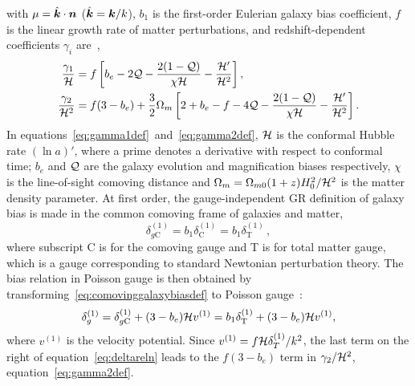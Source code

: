 with \(\mu = \hat{\bm {k}} \cdot \bm {n} \) (\(\hat{\bm {k}} = \bm {k}/k\)), \(b_1\) is the first-order Eulerian galaxy bias coefficient, \(f\) is the linear growth rate of matter perturbations, and redshift-dependent coefficients \(\gamma_i\) are~\cite{Jeong:2011as},
\begin{align}\label{eq:gamma1def}
\frac{\gamma_1}{\mathcal{H}} &= f \left[ b_e - 2 \mathcal{Q} - \frac{2(1-\mathcal{Q})}{\chi \mathcal{H}} - \frac{\mathcal{H}'}{\mathcal{H}^2}\right], \\
\frac{\gamma_2}{\mathcal{H}^2} &= f(3-b_e) + \frac{3}{2} \Omega_m \left[ 2+ b_e - f - 4\mathcal{Q} - \frac{2(1-\mathcal{Q})}{\chi\mathcal{H}} - \frac{\mathcal{H}'}{\mathcal{H}^2} \right].\label{eq:gamma2def}
\end{align}
In equations~\eqref{eq:gamma1def}~and~\eqref{eq:gamma2def}, \(\mathcal{H}\) is the conformal Hubble rate \((\ln a)'\), where a prime denotes a derivative with respect to conformal time; \(b_e\) and \(\mathcal{Q}\) are the galaxy evolution and magnification biases respectively, \(\chi\) is the line-of-sight comoving distance and \(\Omega_m = \Omega_{m0} (1+z) H_0^2/\mathcal{H}^2\) is the matter density parameter. At first order, the gauge-independent GR definition of galaxy bias is made in the common comoving frame of galaxies and matter, 
\begin{equation}\label{eq:comovinggalaxybiasdef}
	\delta_{g\mathrm{C}}^{(1)} = b_1 \delta_\mathrm{C}^{(1)} =  b_1 \delta_\mathrm{T}^{(1)}\,,
\end{equation}
where subscript C is for the comoving gauge and T is for total matter gauge, which is a gauge corresponding to standard Newtonian perturbation theory. The bias relation in Poisson gauge is then obtained by transforming~\eqref{eq:comovinggalaxybiasdef} to Poisson gauge~\cite{Bertacca:2014wga,Jolicoeur:2017eyi}:
\begin{equation}\label{eq:deltareln}
	\delta_g^{(1)} = \delta_{g\mathrm{C}}^{(1)} + (3 - b_e)\mathcal{H} v^{(1)} = b_1 \delta_\mathrm{T}^{(1)} + (3-b_e)\mathcal{H} v^{(1)},
\end{equation}
where \(v^{(1)}\) is the velocity potential. Since \(v^{(1)} =f \mathcal{H} \delta_T^{(1)}/k^2\), the last term on the right of equation~\eqref{eq:deltareln} leads to the \(f(3-b_e)\) term in \(\gamma_2/\mathcal{H}^2\), equation~\eqref{eq:gamma2def}.


